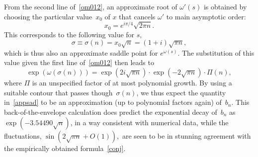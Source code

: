 \documentclass{amsart}
\newtheorem{theorem}{Theorem}
\begin{document}
From the second line of~\eqref{om012}, an approximate root of $\omega'(s)$
is obtained by choosing the particular value~$x_0$ of $x$ that cancels 
$\omega'$ to main asymptotic order:
\begin{equation}\label{x0}
x_0=e^{i\pi/4}\sqrt{2\pi n}.
\end{equation}
This corresponds to the following value for $s$,
\begin{equation}\label{sad0}
\sigma\equiv \sigma(n)= x_0\sqrt{n} = %
(1+i)\sqrt{\pi n},
\end{equation}
which is thus also an approximate saddle point for $e^{\omega(s)}$.
The substitution of this value given the first line of~\eqref{om012} then leads to
\begin{equation}\label{appsad}
\exp\left(\omega(\sigma(n))\right)
=\exp\left(2i\sqrt{\pi n}\right) \cdot \exp\left(-2\sqrt{\pi n}\right)\cdot \Pi(n),
\end{equation}
where $\Pi$ is an
unspecified factor of at most polynomial growth. 
By using a suitable contour that passes though~$\sigma(n)$,
we thus expect the quantity in~\eqref{appsad} to be an approximation
(up to polynomial factors again) of~$b_n$. This back-of-the-envelope calculation
does predict  the exponential decay of~$b_n$ as $\exp\left(-3.54490\sqrt{n}\right)$,
in a way consistent with numerical data, while 
the fluctuations,
$
\sin\left(2\sqrt{\pi n}+O(1)\right),
$
are seen to be in stunning agreement with the empirically obtained formula~\eqref{conj}.

% 
\end{document}
